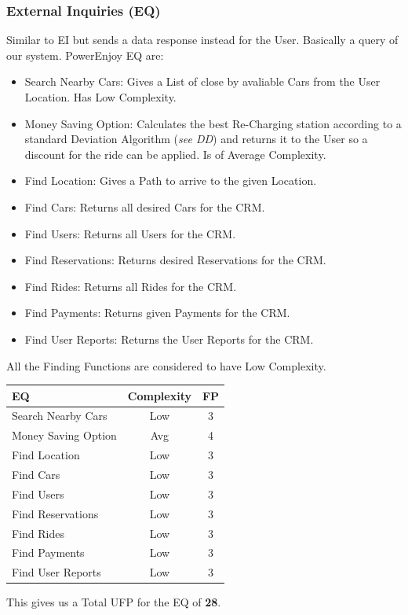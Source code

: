 \documentclass[a4paper]{article}
\begin{document}
\subsubsection{External Inquiries (EQ)}
Similar to EI but sends a data response instead for the User. Basically a query of our system. PowerEnjoy EQ are:
\begin{itemize}
\item Search Nearby Cars: Gives a List of close by avaliable Cars from the User Location. Has Low Complexity.
\item Money Saving Option: Calculates the best Re-Charging station according to a standard Deviation Algorithm (\textit{see DD}) and returns it to the User so a discount for the ride can be applied. Is of Average Complexity.
\item Find Location: Gives a Path to arrive to the given Location.
\item Find Cars: Returns all desired Cars for the CRM.
\item Find Users: Returns all Users for the CRM.
\item Find Reservations: Returns desired Reservations for the CRM.
\item Find Rides: Returns all Rides for the CRM.
\item Find Payments: Returns given Payments for the CRM.
\item Find User Reports: Returns the User Reports for the CRM.
\end{itemize}
All the Finding Functions are considered to have Low Complexity.
\begin{center}
\begin{tabular}{ | l | c | c | }
\hline
	\textbf{EQ} & \textbf{Complexity} & \textbf{FP} \\ \hline\hline
	Search Nearby Cars & Low & 3 \\ \hline
	Money Saving Option & Avg & 4  \\ \hline
	Find Location & Low & 3  \\ \hline
	Find Cars & Low & 3  \\ \hline
	Find Users & Low & 3  \\ \hline
	Find Reservations & Low & 3  \\ \hline
	Find Rides & Low & 3 \\ \hline
	Find Payments & Low & 3 \\ \hline
	Find User Reports & Low &  3  \\ \hline
\end{tabular}
\end{center}
This gives us a Total UFP for the EQ of \textbf{28}.
\newpage
\end{document}
